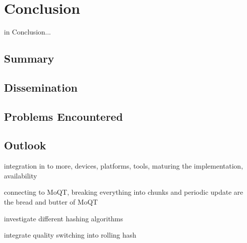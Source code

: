 \chapter{Conclusion\label{cha:chapter7}}

in Conclusion...

\section{Summary\label{sec:summary}}



\section{Dissemination\label{sec:dissemination}}



\section{Problems Encountered\label{sec:problems}}



\section{Outlook\label{sec:outlook}}

integration in to more, devices, platforms, tools, maturing the implementation, availability

connecting to MoQT, breaking everything into chunks and periodic update are the bread and butter of MoQT

investigate different hashing algorithms

integrate quality switching into rolling hash